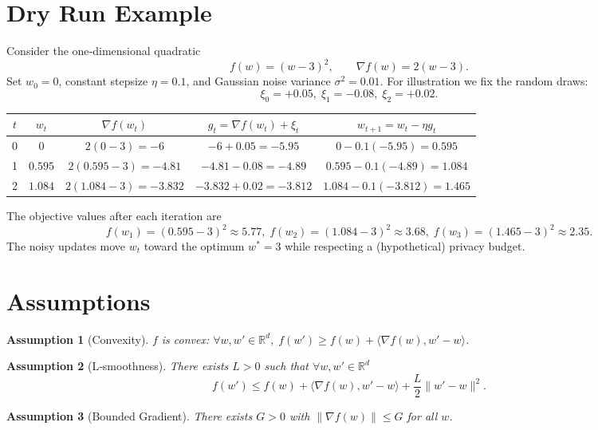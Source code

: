 \documentclass{article}
\newtheorem{assumption}{Assumption}
\newcommand{\R}{\mathbb{R}}
\begin{document}
\section*{Dry Run Example}
Consider the one‑dimensional quadratic
\[
f(w)=(w-3)^{2},\qquad \nabla f(w)=2(w-3).
\]
Set $w_0=0$, constant stepsize $\eta=0.1$, and Gaussian noise variance $\sigma^{2}=0.01$.
For illustration we fix the random draws:
\[
\xi_0=+0.05,\;\xi_1=-0.08,\;\xi_2=+0.02 .
\]

\begin{center}
\begin{tabular}{c|c|c|c|c}
$t$ & $w_t$ & $\nabla f(w_t)$ & $g_t=\nabla f(w_t)+\xi_t$ & $w_{t+1}=w_t-\eta g_t$ \\ \hline
0 & $0$ & $2(0-3)=-6$ & $-6+0.05=-5.95$ & $0-0.1(-5.95)=0.595$ \\[2mm]
1 & $0.595$ & $2(0.595-3)=-4.81$ & $-4.81-0.08=-4.89$ & $0.595-0.1(-4.89)=1.084$ \\[2mm]
2 & $1.084$ & $2(1.084-3)=-3.832$ & $-3.832+0.02=-3.812$ & $1.084-0.1(-3.812)=1.465$ 
\end{tabular}
\end{center}

The objective values after each iteration are
\[
f(w_1)= (0.595-3)^2\approx5.77,\;
f(w_2)= (1.084-3)^2\approx3.68,\;
f(w_3)= (1.465-3)^2\approx2.35 .
\]
The noisy updates move $w_t$ toward the optimum $w^{*}=3$ while respecting a (hypothetical) privacy budget.

\section*{Assumptions}
\begin{assumption}[Convexity]\label{ass:convex}
$f$ is convex: $\forall w,w'\in\R^{d},\; f(w')\ge f(w)+\langle\nabla f(w),w'-w\rangle$.
\end{assumption}

\begin{assumption}[L‑smoothness]\label{ass:smooth}
There exists $L>0$ such that $\forall w,w'\in\R^{d}$
\[
f(w')\le f(w)+\langle\nabla f(w),w'-w\rangle+\frac{L}{2}\|w'-w\|^{2}.
\]
\end{assumption}

\begin{assumption}[Bounded Gradient]\label{ass:bound}
There exists $G>0$ with $\|\nabla f(w)\|\le G$ for all $w$.
\end{assumption}
\end{document}
